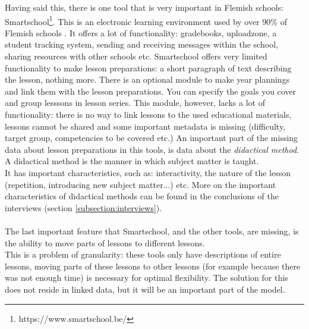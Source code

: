 \documentclass[a4paper]{report}
\begin{document}
    Having said this, there is one tool that is very important in Flemish schools: Smartschool\footnote{https://www.smartschool.be/}.
    This is an electronic learning environment used by over 90\% of Flemish schools \cite{destandaard}. It offers a lot of functionality: gradebooks, uploadzone, a student tracking system, sending and receiving messages within the school, sharing resources with other schools etc.
    Smartschool offers very limited functionality to make lesson preparations: a short paragraph of text describing the lesson, nothing more. There is an optional module to make year plannings and link them with the lesson preparations. You can specify the goals you cover and group lesssons in lesson series.
    This module, however, lacks a lot of functionality: there is no way to link lessons to the used educational materials, lessons cannot be shared and some important metadata is missing (difficulty, target group, competencies to be covered etc.)
    An important part of the missing data about lesson preparations in this tools, is data about the \textit{didactical method}. A didactical method is the manner in which subject matter is taught.\\
    It has important characteristics, such as: interactivity, the nature of the lesson (repetition, introducing new subject matter...) etc. More on the important characteristics of didactical methods can be found in the conclusions of the interviews (section \ref{subsection:interviews}).\\ \\
    The last important feature that Smartschool, and the other tools, are missing, is the ability to move parts of lessons to different lessons.\\
    This is a problem of granularity: these tools only have descriptions of entire lessons, moving parts of these lessons to other lessons (for example because there was not enough time) is necessary for optimal flexibility.
    The solution for this does not reside in linked data, but it will be an important part of the model.
\end{document}
